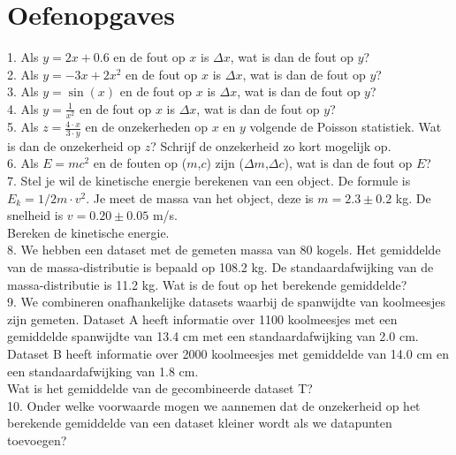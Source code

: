 \section{Oefenopgaves}
\label{/tussentoets-ii/oefenopgaves}

1.  Als $y = 2 x + 0.6$ en de fout op $x$ is $\Delta x$, wat is dan de fout op $y$?\\


2. Als $y = -3 x + 2  x^2$ en de fout op $x$ is $\Delta x$, wat is dan de fout op $y$?\\


3. Als $y = \sin(x)$ en de fout op $x$ is $\Delta x$, wat is dan de fout op $y$?\\


4. Als $y = \frac{1}{x^2}$ en de fout op $x$ is $\Delta x$, wat is dan de fout op $y$?\\


5. Als $z = \frac{4 \cdot x}{3\cdot y}$ en de onzekerheden op $x$ en $y$ volgende de Poisson statistiek. Wat is dan de onzekerheid op $z$? Schrijf de onzekerheid zo kort mogelijk op.\\


6. Als $E = mc^2$ en de fouten op ($m$,$c$) zijn ($\Delta m$,$\Delta c$), wat is dan de fout op $E$?\\


7. Stel je wil de kinetische energie berekenen van een object. De formule is $E_k = 1/2 m \cdot v^2$. Je meet de massa van het object, deze is $m=2.3 \pm 0.2$ kg. De snelheid is $v=0.20 \pm 0.05$ m/s.\\
Bereken de kinetische energie.\\


8. We hebben een dataset met de gemeten massa van 80 kogels. Het gemiddelde van de massa-distributie is bepaald op 108.2 kg. De standaardafwijking van de massa-distributie is 11.2 kg. Wat is de fout op het berekende gemiddelde?\\


9. We combineren onafhankelijke datasets waarbij de spanwijdte van koolmeesjes zijn gemeten. Dataset A heeft informatie over 1100 koolmeesjes met een gemiddelde spanwijdte van 13.4 cm met een standaardafwijking van 2.0 cm. Dataset B heeft informatie over 2000 koolmeesjes met gemiddelde van 14.0 cm en een standaardafwijking van 1.8 cm.\\
Wat is het gemiddelde van de gecombineerde dataset T?\\


10. Onder welke voorwaarde mogen we aannemen dat de onzekerheid op het berekende gemiddelde van een dataset kleiner wordt als we datapunten toevoegen?\\


